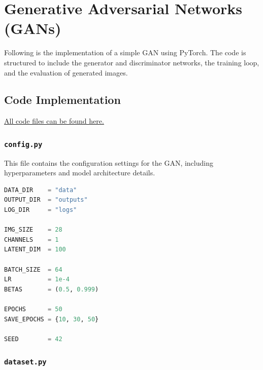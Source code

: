 \documentclass[11pt]{article}
\begin{document}
\pagebreak

\section{Generative Adversarial Networks (GANs)}

Following is the implementation of a simple GAN using PyTorch. The code is structured to include the generator and discriminator networks, the training loop, and the evaluation of generated images.

\subsection{Code Implementation}
\href{https://github.com/your-repo-link}{All code files can be found here.}

\subsubsection{\texttt{config.py}}

This file contains the configuration settings for the GAN, including hyperparameters and model architecture details.

\begin{lstlisting}[language=Python, caption={Hyperparameters and Paths}, label={lst:config}, frame=single, basicstyle=\ttfamily\small, keywordstyle=\color{blue}\bfseries, commentstyle=\color{green!50!black}, stringstyle=\color{red!70!black}]
DATA_DIR    = "data"
OUTPUT_DIR  = "outputs"
LOG_DIR     = "logs"

IMG_SIZE    = 28
CHANNELS    = 1
LATENT_DIM  = 100

BATCH_SIZE  = 64
LR          = 1e-4
BETAS       = (0.5, 0.999)

EPOCHS      = 50
SAVE_EPOCHS = {10, 30, 50}

SEED        = 42
\end{lstlisting}

\subsubsection{\texttt{dataset.py}}
\end{document}
